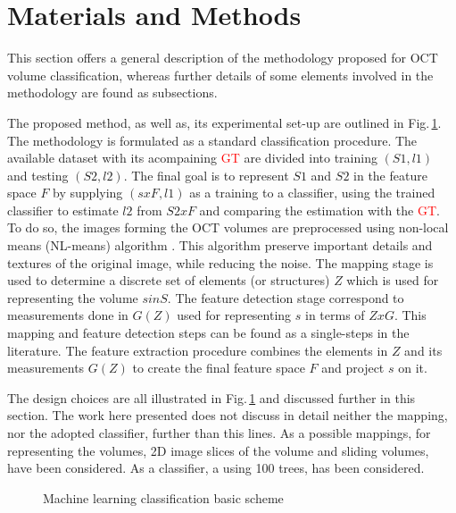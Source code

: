 \graphicspath{ {./content/method/figures/}}

\section{Materials and Methods}

 This section offers a general description of the methodology proposed for OCT volume classification, whereas further details of some elements involved in the methodology are found as subsections.
  
  The proposed method, as well as, its experimental set-up are outlined in Fig.\,\ref{fig:ML-scheme}.
  The methodology is formulated as a standard classification procedure.
  The available dataset with its acompaining \textcolor{red}{GT} are divided into training $(S1,l1)$ and testing $(S2,l2)$. 
  The final goal is to represent $S1$ and $S2$ in the feature space $F$ by supplying $(sxF,l1)$ as a training to a classifier, using the trained classifier to estimate $l2$ from $S2xF$ and comparing the estimation with the \textcolor{red}{GT}.
   To do so, the images forming the OCT volumes are preprocessed using non-local means (NL-means) algorithm \cite{buades2005non}. This algorithm preserve important details and textures of the original image, while reducing the noise.
   The mapping stage is used to determine a discrete set of elements (or structures) $Z$  which is used for representing the volume $s  in S$.
   The feature detection stage correspond to measurements done in $G(Z)$ used for representing $s$ in terms of $ZxG$. 
   This mapping and feature detection steps can be found as a single-steps in the literature.
   The feature extraction procedure combines the elements in $Z$ and its measurements $G(Z)$ to create the final feature space $F$ and project $s$ on it.
   
   The design choices are all illustrated in Fig.\,\ref{fig:ML-scheme} and discussed further in this section. The work here presented does not discuss in detail neither the mapping, nor the adopted classifier, further than this lines.
   As a possible mappings, for representing the volumes, 2D image slices of the volume and \color{red}{7x7x7}\color{black} sliding volumes, have been considered. 
   As a classifier, a \color{red}{Random Forest}\color{black} using 100 trees, has been considered.
   
\begin{figure}[h]
  \caption{Machine learning classification basic scheme}
  \label{fig:ML-scheme}
\end{figure}

